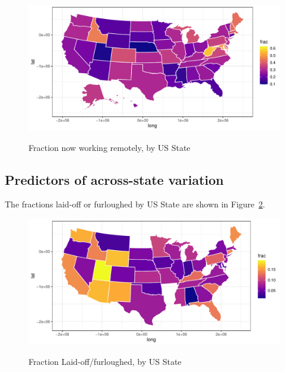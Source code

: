 \documentclass[12pt]{article}
\begin{document}
\begin{figure}
  \caption{Fraction now working remotely, by US State} \label{fig:geo_wfh}
\centering
\begin{minipage}{1.0 \linewidth}
  \includegraphics[width = \linewidth]{plots/geo_wfh.pdf} \\
  \begin{footnotesize}
    \end{footnotesize}
\end{minipage}
\end{figure} 

\subsection{Predictors of across-state variation} \label{sec:predictorsstate}
The fractions laid-off or furloughed by US State are shown in Figure~\ref{fig:geo_laidoff}.

\begin{figure}
  \caption{Fraction Laid-off/furloughed, by US State} \label{fig:geo_laidoff}
\centering
\begin{minipage}{1.0 \linewidth}
  \includegraphics[width = \linewidth]{plots/geo_laidoff.pdf} \\
  \begin{footnotesize}
    \end{footnotesize}
\end{minipage}
\end{figure} 
\end{document}
